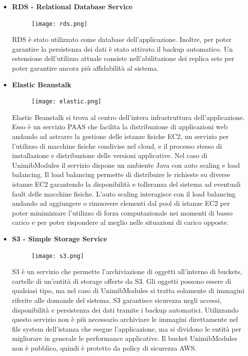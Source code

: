 \documentclass[12pt]{article}
\begin{document}
			\begin{itemize}
				\item \textbf{RDS - Relational Database Service}
				\begin{figure}[H]
					\texttt{[image: rds.png]}
				\end{figure}
				RDS è stato utilizzato come database dell'applicazione. Inoltre, per poter garantire la persistenza dei dati è stato attivato il backup automatico. Un estensione dell'utilizzo attuale consiste nell'abilitazione dei replica sets per poter garantire ancora più affidabilità al sistema.
				\item \textbf{Elastic Beanstalk}
				\begin{figure}[H]
					\texttt{[image: elastic.png]}
				\end{figure}
				Elastic Beanstalk si trova al centro dell'intera infrastruttura dell'applicazione. Esso è un servizio PAAS che facilita la distribuzione di applicazioni web andando ad astrarre la gestione delle istanze fisiche EC2, un servizio per l'utilizzo di macchine fisiche condivise nel cloud, e il processo stesso di installazione e distribuzione delle versioni applicative. Nel caso di UnimibModules il servizio dispone  un ambiente Java con auto scaling e load balancing. Il load balancing permette di distribuire le richieste su diverse istanze EC2 garantendo la disponibilità  e tolleranza del sistema ad eventuali fault delle macchine fisiche. L'auto scaling interagisce con il load balancing andando ad aggiungere o rimuovere elementi dal pool di istanze EC2 per poter minimizzare l'utilizzo di forza computazionale nei momenti di basso carico  e per poter rispondere al meglio nelle situazioni di carico opposte.
				\item \textbf{S3 - Simple Storage Service}
				\begin{figure}[H]
					\texttt{[image: s3.png]}
				\end{figure}
				S3 è un servizio che permette l'archiviazione di oggetti all'interno di buckets, cartelle di un'entità di storage offerte da S3. Gli oggetti possono essere di qualsiasi tipo, ma nel caso di UnimibModules si tratta solamente di immagini riferite alle domande del sistema. S3 garantisce sicurezza negli accessi, disponibilità e persistenza dei dati tramite i backup automatici. Utilizzando questo servizio non è più necessario archiviare le immagini direttamente nel file system dell'istanza che esegue l'applicazione, ma si dividono le entità per migliorare in generale le performance applicative. Il bucket UnimibModules non è pubblico, quindi è protetto da policy di sicurezza AWS.

\end{itemize}
\end{document}
